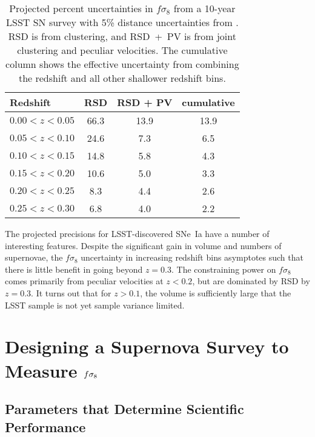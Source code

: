 \documentclass{aastex62}   	%
\begin{document}
\begin{table}
   \centering
   \begin{tabular}{@{} lccc @{}} %
	\hline
	Redshift & RSD & RSD + PV & cumulative\\ \hline
      $0.00<z<0.05$   & 66.3 & 13.9 & 13.9\\
     $0.05<z<0.10$            & 24.6     &  7.3 & 6.5\\
     $0.10<z<0.15$      & 14.8  & 5.8 & 4.3\\
     $0.15<z<0.20$      & 10.6  & 5.0 & 3.3\\
      $0.20<z<0.25$     & 8.3  & 4.4 & 2.6\\
     $0.25<z<0.30$  & 6.8  &  4.0 & 2.2\\
      \hline
   \end{tabular}
   \caption{Projected percent uncertainties in $f\sigma_8$ from a 10-year LSST SN survey with 5\% distance uncertainties from
   \citet{2017ApJ...847..128H}. RSD is from clustering, and RSD~+~PV is from joint clustering and peculiar velocities.
   The cumulative column shows the effective uncertainty from combining the redshift and all other shallower redshift bins.}
   \label{tab:howlett}
\end{table}

The projected precisions for LSST-discovered SNe~Ia have a number of interesting features. 
Despite the significant gain in volume and numbers of supernovae, the $f\sigma_8$ uncertainty in increasing redshift bins asymptotes such that 
there is little benefit in going beyond
$z=0.3$.
The constraining power on  $f\sigma_8$ 
comes primarily from peculiar velocities
at $z<0.2$, but are dominated by RSD by $z=0.3$.
It turns out that for $z>0.1$, the volume is sufficiently large that the LSST sample is not yet sample variance limited.

\section{Designing a Supernova Survey to Measure $\MakeLowercase{f}\sigma_8$}
\subsection{Parameters that Determine Scientific Performance}
\end{document}
